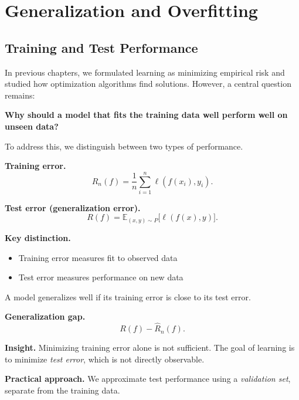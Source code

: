 \chapter{Generalization and Overfitting}

\section{Training and Test Performance}

In previous chapters, we formulated learning as minimizing empirical risk and studied how optimization algorithms find solutions. However, a central question remains:

\medskip

\noindent
\textbf{Why should a model that fits the training data well perform well on unseen data?}

\medskip

To address this, we distinguish between two types of performance.

\medskip

\noindent
\textbf{Training error.}
\[
\hat{R}_n(f) = \frac{1}{n} \sum_{i=1}^n \ell(f(x_i), y_i).
\]

\medskip

\noindent
\textbf{Test error (generalization error).}
\[
R(f) = \mathbb{E}_{(x,y)\sim P} \big[ \ell(f(x), y) \big].
\]

\medskip

\noindent
\textbf{Key distinction.}
\begin{itemize}
    \item Training error measures fit to observed data
    \item Test error measures performance on new data
\end{itemize}

\medskip

\noindent
A model generalizes well if its training error is close to its test error.

\medskip

\noindent
\textbf{Generalization gap.}
\[
R(f) - \hat{R}_n(f).
\]

\medskip

\noindent
\textbf{Insight.}  
Minimizing training error alone is not sufficient. The goal of learning is to minimize \emph{test error}, which is not directly observable.

\medskip

\noindent
\textbf{Practical approach.}  
We approximate test performance using a \emph{validation set}, separate from the training data.

